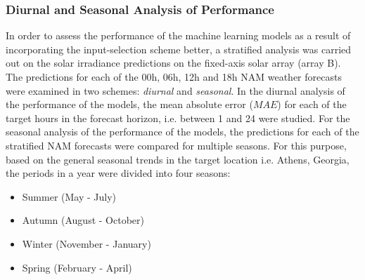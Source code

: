 \subsubsection*{Diurnal and Seasonal Analysis of Performance}
\par In order to assess the performance of the machine learning models as a result of incorporating the input-selection scheme better, a stratified analysis was carried out on the solar irradiance predictions on the fixed-axis solar array (array B). The predictions for each of the 00h, 06h, 12h and 18h NAM weather forecasts were examined in two schemes: \textit{diurnal} and \textit{seasonal}. In the diurnal analysis of the performance of the models, the mean absolute error ($MAE$) for each of the target hours in the forecast horizon, i.e. between 1 and 24 were studied. For the seasonal analysis of the performance of the models, the predictions for each of the stratified NAM forecasts were compared for multiple seasons. For this purpose, based on the general seasonal trends in the target location i.e. Athens, Georgia, the periods in a year were divided into four seasons: 
\begin{itemize}
    \itemsep0em
    \item Summer (May - July)
    \item Autumn (August - October)
    \item Winter (November - January)
    \item Spring (February - April)
\end{itemize}

